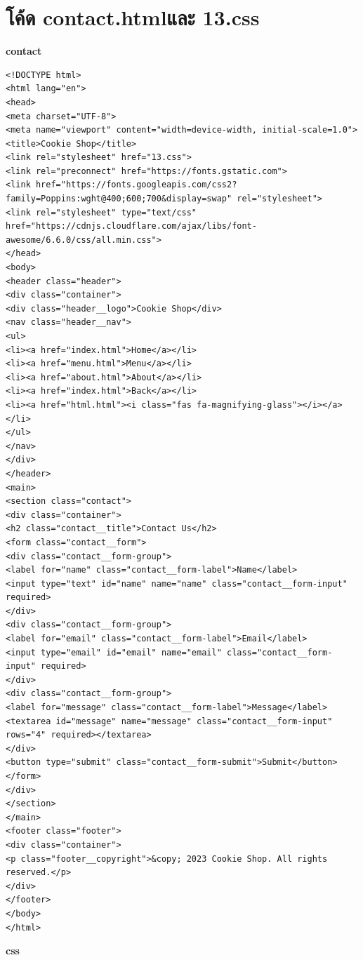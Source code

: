 \documentclass{report}
\begin{document}
\section{โค้ด contact.htmlและ 13.css}
\textbf{contact}
\begin{verbatim}
<!DOCTYPE html>
<html lang="en">
<head>
<meta charset="UTF-8">
<meta name="viewport" content="width=device-width, initial-scale=1.0">
<title>Cookie Shop</title>
<link rel="stylesheet" href="13.css">
<link rel="preconnect" href="https://fonts.gstatic.com">
<link href="https://fonts.googleapis.com/css2?family=Poppins:wght@400;600;700&display=swap" rel="stylesheet">
<link rel="stylesheet" type="text/css" href="https://cdnjs.cloudflare.com/ajax/libs/font-awesome/6.6.0/css/all.min.css">
</head>
<body>
<header class="header">
<div class="container">
<div class="header__logo">Cookie Shop</div>
<nav class="header__nav">
<ul>
<li><a href="index.html">Home</a></li>
<li><a href="menu.html">Menu</a></li>
<li><a href="about.html">About</a></li>
<li><a href="index.html">Back</a></li>
<li><a href="html.html"><i class="fas fa-magnifying-glass"></i></a></li>
</ul>
</nav>
</div>
</header>
<main>
<section class="contact">
<div class="container">
<h2 class="contact__title">Contact Us</h2>
<form class="contact__form">
<div class="contact__form-group">
<label for="name" class="contact__form-label">Name</label>
<input type="text" id="name" name="name" class="contact__form-input" required>
</div>
<div class="contact__form-group">
<label for="email" class="contact__form-label">Email</label>
<input type="email" id="email" name="email" class="contact__form-input" required>
</div>
<div class="contact__form-group">
<label for="message" class="contact__form-label">Message</label>
<textarea id="message" name="message" class="contact__form-input" rows="4" required></textarea>
</div>
<button type="submit" class="contact__form-submit">Submit</button>
</form>
</div>
</section>
</main>
<footer class="footer">
<div class="container">
<p class="footer__copyright">&copy; 2023 Cookie Shop. All rights reserved.</p>
</div>
</footer>
</body>
</html>
\end{verbatim}
\textbf{css}
\end{document}

